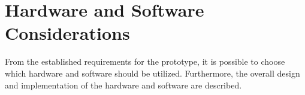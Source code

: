 \chapter{Hardware and Software\\ Considerations}

From the established requirements for the prototype, it is possible to choose which hardware and software should be utilized. Furthermore, the overall design and implementation of the hardware and software are described.
